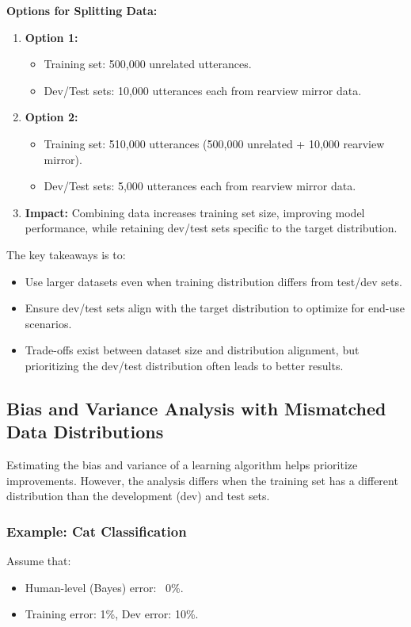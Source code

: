\documentclass[letterpaper,12pt,notitlepage,twoside]{report}
\begin{document}
\textbf{Options for Splitting Data:}
\begin{enumerate}
    \item \textbf{Option 1:}
    \begin{itemize}
        \item Training set: 500,000 unrelated utterances.
        \item Dev/Test sets: 10,000 utterances each from rearview mirror data.
    \end{itemize}
    \item \textbf{Option 2:}
    \begin{itemize}
        \item Training set: 510,000 utterances (500,000 unrelated + 10,000 rearview mirror).
        \item Dev/Test sets: 5,000 utterances each from rearview mirror data.
    \end{itemize}
    \item \textbf{Impact:} Combining data increases training set size, improving model performance, while retaining dev/test sets specific to the target distribution.
\end{enumerate}

The key takeaways is to:
\begin{itemize}
    \item Use larger datasets even when training distribution differs from test/dev sets.
    \item Ensure dev/test sets align with the target distribution to optimize for end-use scenarios.
    \item Trade-offs exist between dataset size and distribution alignment, but prioritizing the dev/test distribution often leads to better results.
\end{itemize}


\subsection*{Bias and Variance Analysis with Mismatched Data Distributions}

Estimating the bias and variance of a learning algorithm helps prioritize improvements. However, the analysis differs when the training set has a different distribution than the development (dev) and test sets. 

\subsubsection*{Example: Cat Classification}
Assume that:
\begin{itemize}
    \item Human-level (Bayes) error: ~0\%.
    \item Training error: 1\%, Dev error: 10\%.
\end{itemize}
\end{document}
